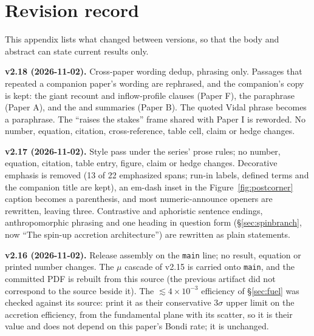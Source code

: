 \documentclass[11pt]{article}
\begin{document}
\section{Revision record}
\label{app:revisions}

This appendix lists what changed between versions, so that the body and abstract can state current results only.

\textbf{v2.18 (2026-11-02).} Cross-paper wording dedup, phrasing only. Passages that repeated a companion paper's wording are rephrased, and the companion's copy is kept: the giant recount and inflow-profile clauses (Paper F), the \citet{Curtis2026DysonMinds} paraphrase (Paper A), and the \citet{Vidal2026Review} and \citet{Crane2009} summaries (Paper B). The quoted Vidal phrase becomes a paraphrase. The ``raises the stakes'' frame shared with Paper I is reworded. No number, equation, citation, cross-reference, table cell, claim or hedge changes.

\textbf{v2.17 (2026-11-02).} Style pass under the series' prose rules; no number, equation, citation, table entry, figure, claim or hedge changes. Decorative emphasis is removed (13 of 22 emphasized spans; run-in labels, defined terms and the companion title are kept), an em-dash inset in the Figure~\ref{fig:postcorner} caption becomes a parenthesis, and most numeric-announce openers are rewritten, leaving three. Contrastive and aphoristic sentence endings, anthropomorphic phrasing and one heading in question form (\S\ref{sec:spinbranch}, now ``The spin-up accretion architecture'') are rewritten as plain statements.

\textbf{v2.16 (2026-11-02).} Release assembly on the \texttt{main} line; no result, equation or printed number changes. The $\mu$ cascade of v2.15 is carried onto \texttt{main}, and the committed PDF is rebuilt from this source (the previous artifact did not correspond to the source beside it). The $\lesssim 4\times10^{-3}$ efficiency of \S\ref{sec:fuel} was checked against its source: \citet{Mahida2026} print it as their conservative $3\sigma$ upper limit on the accretion efficiency, from the fundamental plane with its scatter, so it is their value and does not depend on this paper's Bondi rate; it is unchanged.
\end{document}
